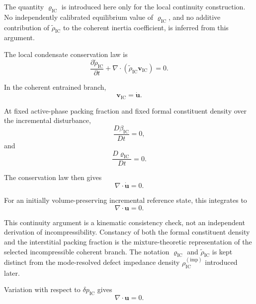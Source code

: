 The quantity $\varrho_{\mathrm{IC}}$ is introduced here only for the local continuity construction. No independently calibrated equilibrium value of $\varrho_{\mathrm{IC}}$, and no additive contribution of $\widetilde{\rho}_{\mathrm{IC}}$ to the coherent inertia coefficient, is inferred from this argument.

The local condensate conservation law is
\begin{equation}
    \frac{\partial\widetilde{\rho}_{\mathrm{IC}}}{\partial t} + \nabla\cdot\left(\widetilde{\rho}_{\mathrm{IC}}\mathbf{v}_{\mathrm{IC}}\right) = 0.
\end{equation}

In the coherent entrained branch,
\begin{equation}
    \mathbf{v}_{\mathrm{IC}} = \dot{\mathbf{u}}.
\end{equation}

At fixed active-phase packing fraction and fixed formal constituent density over the incremental disturbance,
\begin{equation}
    \frac{D\beta_{\mathrm{IC}}}{Dt} = 0,
\end{equation}
and
\begin{equation}
    \frac{D\varrho_{\mathrm{IC}}}{Dt} = 0.
\end{equation}

The conservation law then gives
\begin{equation}
    \nabla\cdot\dot{\mathbf{u}} = 0.
\end{equation}

For an initially volume-preserving incremental reference state, this integrates to
\begin{equation}
    \nabla\cdot\mathbf{u} = 0.
\end{equation}

This continuity argument is a kinematic consistency check, not an independent derivation of incompressibility. Constancy of both the formal constituent density and the interstitial packing fraction is the mixture-theoretic representation of the selected incompressible coherent branch. The notation $\varrho_{\mathrm{IC}}$ and $\widetilde{\rho}_{\mathrm{IC}}$ is kept distinct from the mode-resolved defect impedance density $\rho_{\mathrm{IC}}^{(\mathrm{imp})}$ introduced later.

Variation with respect to $\delta p_{\mathrm{IC}}$ gives
\begin{equation}
    \nabla\cdot\mathbf{u} = 0.
\end{equation}

